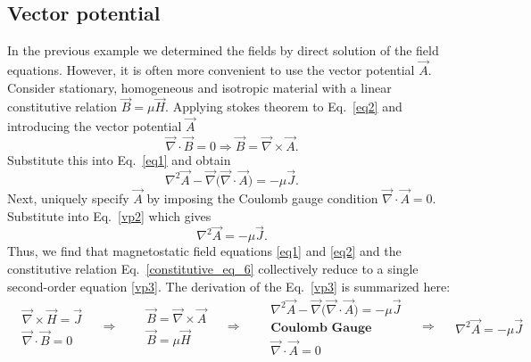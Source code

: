 \documentclass[12pt,a4paper,oneside]{book}
\begin{document}
\begin{onehalfspace}
\subsection{Vector potential}
In the previous example we determined the fields by direct solution of the field equations. However, it is often more convenient to use the vector potential $\vec{A}$. 
Consider stationary, homogeneous and isotropic material with a linear constitutive relation $\vec{B}=\mu\vec{H}$. Applying stokes theorem to Eq.~\eqref{eq2} and introducing the vector potential $\vec{A}$ 
\begin{equation}\label{vp1}
	\vec{\nabla}\cdot\vec{B}=0\Rightarrow\vec{B}=\vec{\nabla}\times\vec{A}.
\end{equation}
Substitute this into Eq.~\eqref{eq1} and obtain 
\begin{equation}\label{vp2}
	\nabla^2\vec{A}-\vec{\nabla}\big( \vec{\nabla}\cdot\vec{A}\big)=-\mu\vec{J}.
\end{equation}
Next, uniquely specify $\vec{A}$ by imposing the Coulomb gauge condition $\vec{\nabla}\cdot\vec{A}=0$. Substitute into Eq.~\eqref{vp2} which gives
\begin{equation}\label{vp3}
	\nabla^2\vec{A}=-\mu\vec{J}.
\end{equation}
Thus, we find that magnetostatic field equations \ref{eq1} and \ref{eq2} and the constitutive relation Eq.~\eqref{constitutive_eq_6} collectively reduce to a single second-order equation \ref{vp3}. The derivation of the Eq.~\eqref{vp3} is summarized here:
\begin{equation*}\label{}
\boxed{	\begin{aligned}
		&\vec{\nabla}\times\vec{H}=\vec{J}\\[6pt]
		&\vec{\nabla}\cdot\vec{B}=0
	\end{aligned}}\quad\Rightarrow\quad
\boxed{	\begin{aligned}
		&\vec{B}=\vec{\nabla}\times\vec{A}\\[6pt]
		&\vec{B}=\mu\vec{H}
	\end{aligned}}\quad\Rightarrow\quad
\boxed{	\begin{aligned}
		&\nabla^2\vec{A}-\vec{\nabla}\big( \vec{\nabla}\cdot\vec{A}\big)=-\mu\vec{J}\\[6pt]
		&\textbf{Coulomb Gauge} \\[6pt]
		&\vec{\nabla}\cdot\vec{A}=0
	\end{aligned}}\quad\Rightarrow\quad
\boxed{	\begin{aligned}
		\nabla^2\vec{A}=-\mu\vec{J}
\end{aligned}}

\end{equation*}
\end{onehalfspace}
\end{document}

